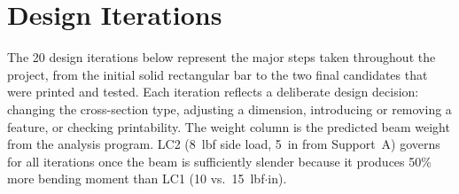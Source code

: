 \documentclass[11pt,letterpaper]{article}
\begin{document}
\appendix
\section{Design Iterations}
\label{sec:appendix}

The 20 design iterations below represent the major steps taken throughout
the project, from the initial solid rectangular bar to the two final
candidates that were printed and tested.  Each iteration reflects a
deliberate design decision: changing the cross-section type, adjusting
a dimension, introducing or removing a feature, or checking printability.
The weight column is the predicted beam weight from the analysis program.
LC2 (8~lbf side load, 5~in from Support~A) governs for all iterations
once the beam is sufficiently slender because it produces 50\% more
bending moment than LC1 (10 vs.\ 15~lbf$\cdot$in).
\end{document}
